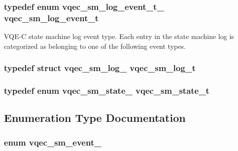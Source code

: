 \subsubsection{\setlength{\rightskip}{0pt plus 5cm}typedef enum \bf{vqec\_\-sm\_\-log\_\-event\_\-t\_\-}  \bf{vqec\_\-sm\_\-log\_\-event\_\-t}}\label{vqec__sm_8h_ee5312be3c716793fbf1e9a5f51ab1be}


VQE-C state machine log event type. Each entry in the state machine log is categorized as belonging to one of the following event types. 
\subsubsection{\setlength{\rightskip}{0pt plus 5cm}typedef struct \bf{vqec\_\-sm\_\-log\_\-}  \bf{vqec\_\-sm\_\-log\_\-t}}\label{vqec__sm_8h_f84089e6995eef7dc1e67633df6b322b}


\subsubsection{\setlength{\rightskip}{0pt plus 5cm}typedef enum \bf{vqec\_\-sm\_\-state\_\-}  \bf{vqec\_\-sm\_\-state\_\-t}}\label{vqec__sm_8h_b1dd9fad5cee8cdc50bd9aa7eda53b04}




\subsection{Enumeration Type Documentation}
\subsubsection{\setlength{\rightskip}{0pt plus 5cm}enum \bf{vqec\_\-sm\_\-event\_\-}}\label{vqec__sm_8h_bece8113c09a01fa04fbef2397e5672b}


